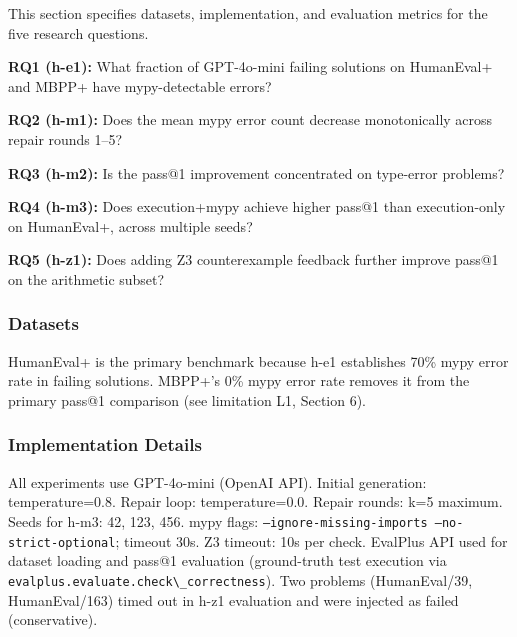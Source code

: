 
This section specifies datasets, implementation, and evaluation metrics for the five research questions.

\textbf{RQ1 (h-e1):} What fraction of GPT-4o-mini failing solutions on HumanEval+ and MBPP+ have mypy-detectable errors?

\textbf{RQ2 (h-m1):} Does the mean mypy error count decrease monotonically across repair rounds 1--5?

\textbf{RQ3 (h-m2):} Is the pass@1 improvement concentrated on type-error problems?

\textbf{RQ4 (h-m3):} Does execution+mypy achieve higher pass@1 than execution-only on HumanEval+, across multiple seeds?

\textbf{RQ5 (h-z1):} Does adding Z3 counterexample feedback further improve pass@1 on the arithmetic subset?

\subsubsection{Datasets}

\begin{table}[htbp]
\centering
{}
\end{table}

HumanEval+ is the primary benchmark because h-e1 establishes 70\% mypy error rate in failing solutions. MBPP+'s 0\% mypy error rate removes it from the primary pass@1 comparison (see limitation L1, Section 6).

\subsubsection{Implementation Details}

All experiments use GPT-4o-mini (OpenAI API). Initial generation: temperature=0.8. Repair loop: temperature=0.0. Repair rounds: k=5 maximum. Seeds for h-m3: {42, 123, 456}. mypy flags: \texttt{--ignore-missing-imports --no-strict-optional}; timeout 30s. Z3 timeout: 10s per check. EvalPlus API used for dataset loading and pass@1 evaluation (ground-truth test execution via \texttt{evalplus.evaluate.check\textbackslash \_correctness}). Two problems (HumanEval/39, HumanEval/163) timed out in h-z1 evaluation and were injected as failed (conservative).

